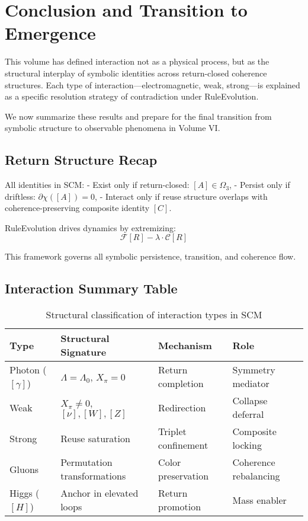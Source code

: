 \chapter{Conclusion and Transition to Emergence} \label{chapter-v-conclusion}

This volume has defined interaction not as a physical process, but as the structural interplay of symbolic identities across return-closed coherence structures. Each type of interaction—electromagnetic, weak, strong—is explained as a specific resolution strategy of contradiction under RuleEvolution.

We now summarize these results and prepare for the final transition from symbolic structure to observable phenomena in Volume VI.

\section{Return Structure Recap} \label{sec:recap-return}

All identities in SCM:
- Exist only if return-closed: $[A] \in \Omega_3$,
- Persist only if driftless: $\partial\chi([A]) = 0$,
- Interact only if reuse structure overlaps with coherence-preserving composite identity $[C]$.

RuleEvolution drives dynamics by extremizing:
\[
\mathcal{F}[R] - \lambda \cdot \mathcal{C}[R]
\]

This framework governs all symbolic persistence, transition, and coherence flow.

\section{Interaction Summary Table} \label{sec:interaction-summary}

\begin{table}[h!]
\centering
\begin{tabular}{|l|l|l|l|}
\hline
\textbf{Type} & \textbf{Structural Signature} & \textbf{Mechanism} & \textbf{Role} \\
\hline
Photon ($[\gamma]$) & $\Lambda = \Lambda_0$, $X_\pi = 0$ & Return completion & Symmetry mediator \\
Weak & $X_\pi \ne 0$, $[\nu], [W], [Z]$ & Redirection & Collapse deferral \\
Strong & Reuse saturation & Triplet confinement & Composite locking \\
Gluons & Permutation transformations & Color preservation & Coherence rebalancing \\
Higgs ($[H]$) & Anchor in elevated loops & Return promotion & Mass enabler \\
\hline
\end{tabular}
\caption{Structural classification of interaction types in SCM}
\end{table}

